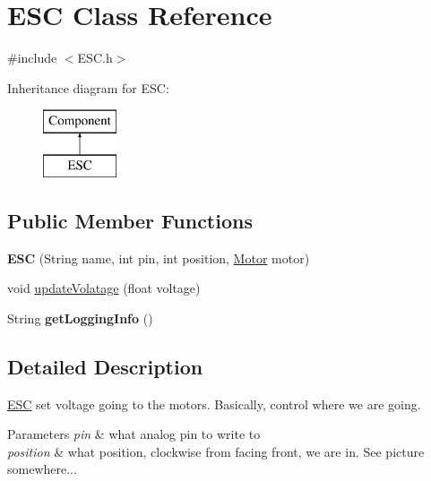 \hypertarget{classESC}{}\section{E\+S\+C Class Reference}
\label{classESC}


{\ttfamily \#include $<$E\+S\+C.\+h$>$}

Inheritance diagram for E\+S\+C\+:\begin{figure}[H]
\begin{center}
\leavevmode
\includegraphics[height=2.000000cm]{classESC}
\end{center}
\end{figure}
\subsection*{Public Member Functions}
\begin{DoxyCompactItemize}
\item 
\hypertarget{classESC_a4254d339c64e305cb62ca42c6e439b9d}{}{\bfseries E\+S\+C} (String name, int pin, int position, \hyperlink{classMotor}{Motor} motor)\label{classESC_a4254d339c64e305cb62ca42c6e439b9d}

\item 
void \hyperlink{classESC_a4abfa0f0850c7c02c6e9c9adb405743d}{update\+Volatage} (float voltage)
\item 
\hypertarget{classESC_abdc82845ef1b09b94a89eba26610a8ff}{}String {\bfseries get\+Logging\+Info} ()\label{classESC_abdc82845ef1b09b94a89eba26610a8ff}

\end{DoxyCompactItemize}


\subsection{Detailed Description}
\hyperlink{classESC}{E\+S\+C} set voltage going to the motors. Basically, control where we are going. 
\begin{DoxyParams}{Parameters}
{\em pin} & what analog pin to write to \\
\hline
{\em position} & what position, clockwise from facing front, we are in. See picture somewhere... \\
\hline
\end{DoxyParams}


